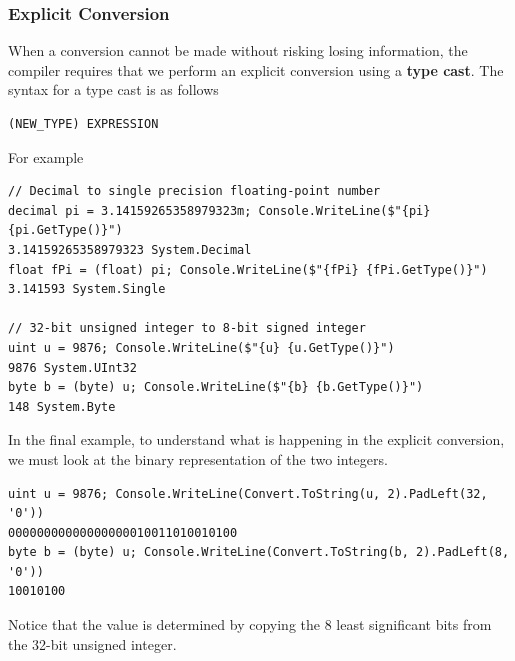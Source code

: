 \documentclass{article}
\def\customlinemarker#1#2{
    \edef\thelstnumber{%
        \unexpanded{%
            \ifnum#1=\value{lstnumber}\relax
              #2%
            \fi}%
        \ifx\thelstnumber\relax\else
        \expandafter\unexpanded\expandafter{\thelstnumber}%
        \fi
    }
}
\begin{document}
\subsubsection{Explicit Conversion}
When a conversion cannot be made without risking losing information,
the compiler requires that we perform an explicit conversion using a \textbf{type cast}.
The syntax for a type cast is as follows
\begin{lstlisting}[numbers=none]
(NEW_TYPE) EXPRESSION
\end{lstlisting}
For example
\begingroup
\let\thelstnumber\relax
\customlinemarker{1}{\$}
\customlinemarker{2}{\$}
\customlinemarker{4}{\$}
\customlinemarker{7}{\$}
\customlinemarker{8}{\$}
\customlinemarker{10}{\$}
\begin{lstlisting}
// Decimal to single precision floating-point number
decimal pi = 3.14159265358979323m; Console.WriteLine($"{pi} {pi.GetType()}")
3.14159265358979323 System.Decimal
float fPi = (float) pi; Console.WriteLine($"{fPi} {fPi.GetType()}")
3.141593 System.Single

// 32-bit unsigned integer to 8-bit signed integer
uint u = 9876; Console.WriteLine($"{u} {u.GetType()}")
9876 System.UInt32
byte b = (byte) u; Console.WriteLine($"{b} {b.GetType()}")
148 System.Byte
\end{lstlisting}
\endgroup
In the final example, to understand what is happening in the explicit conversion,
we must look at the binary representation of the two integers.
\begingroup
\let\thelstnumber\relax
\customlinemarker{1}{\$}
\customlinemarker{3}{\$}
\begin{lstlisting}
uint u = 9876; Console.WriteLine(Convert.ToString(u, 2).PadLeft(32, '0'))
00000000000000000010011010010100
byte b = (byte) u; Console.WriteLine(Convert.ToString(b, 2).PadLeft(8, '0'))
10010100
\end{lstlisting}
\endgroup
Notice that the value is determined by copying the 8 least significant bits
from the 32-bit unsigned integer.
\end{document}
